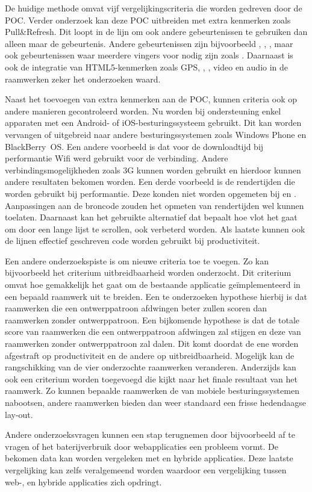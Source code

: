 De huidige methode omvat vijf vergelijkingscriteria die worden gedreven door de POC.
Verder onderzoek kan deze POC uitbreiden met extra kenmerken zoals Pull\&Refresh.
Dit loopt in de lijn om ook andere gebeurtenissen te gebruiken dan alleen maar de  gebeurtenis.
Andere gebeurtenissen zijn bijvoorbeeld , , , maar ook gebeurtenissen waar meerdere vingers voor nodig zijn zoals .
Daarnaast is ook de integratie van HTML5-kenmerken zoals GPS, , , video en audio in de raamwerken zeker het onderzoeken waard.

Naast het toevoegen van extra kenmerken aan de POC, kunnen criteria ook op andere manieren gecontroleerd worden.
Nu worden bij ondersteuning enkel apparaten met een Android- of iOS-besturingssysteem gebruikt.
Dit kan worden vervangen of uitgebreid naar andere besturingssystemen zoals Windows Phone en BlackBerry~OS.
Een andere voorbeeld is dat voor de downloadtijd bij performantie Wifi werd gebruikt voor de verbinding.
Andere verbindingsmogelijkheden zoals 3G kunnen worden gebruikt en hierdoor kunnen andere resultaten bekomen worden.
Een derde voorbeeld is de rendertijden die worden gebruikt bij performantie.
Deze konden niet worden opgemeten bij \st{} en \lungo{}.
Aanpassingen aan de broncode zouden het opmeten van rendertijden wel kunnen toelaten.
Daarnaast kan het gebruikte alternatief dat bepaalt hoe vlot het gaat om door een lange lijst te scrollen, ook verbeterd worden.
Als laatste kunnen ook de lijnen effectief geschreven code worden gebruikt bij productiviteit. 

Een andere onderzoekspiste is om nieuwe criteria toe te voegen.
Zo kan bijvoorbeeld het criterium uitbreidbaarheid worden onderzocht.
Dit criterium omvat hoe gemakkelijk het gaat om de bestaande applicatie geïmplementeerd in een bepaald raamwerk uit te breiden.
Een te onderzoeken hypothese hierbij is dat raamwerken die een ontwerppatroon afdwingen beter zullen scoren dan raamwerken zonder ontwerppatroon.
Een bijkomende hypothese is dat de totale score van raamwerken die een ontwerppatroon afdwingen zal stijgen en deze van raamwerken zonder ontwerppatroon zal dalen.
Dit komt doordat de ene worden afgestraft op productiviteit en de andere op uitbreidbaarheid.
Mogelijk kan de rangschikking van de vier onderzochte raamwerken veranderen.
Anderzijds kan ook een criterium worden toegevoegd die kijkt naar het finale resultaat van het raamwerk.
Zo kunnen bepaalde raamwerken de  van mobiele besturingssystemen  nabootsen, andere raamwerken bieden dan weer standaard een frisse hedendaagse lay-out.

Andere onderzoeksvragen kunnen een stap terugnemen door bijvoorbeeld af te vragen of het baterijverbruik door webapplicaties een probleem vormt.
De bekomen data kan worden vergeleken met  en hybride applicaties.
Deze laatste vergelijking kan zelfs veralgemeend worden waardoor een vergelijking tussen web-,  en hybride applicaties zich opdringt. 


